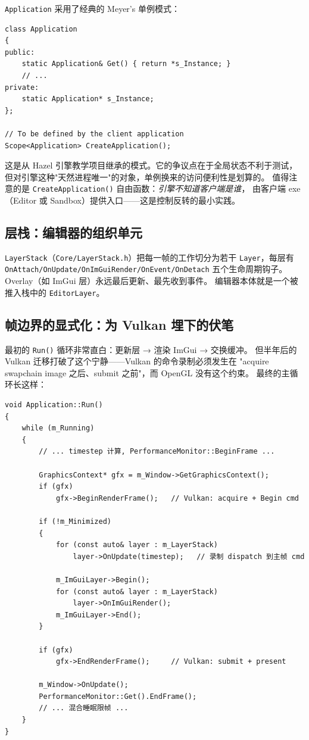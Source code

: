 \texttt{Application} 采用了经典的 Meyer's 单例模式：

\begin{lstlisting}
class Application
{
public:
    static Application& Get() { return *s_Instance; }
    // ...
private:
    static Application* s_Instance;
};

// To be defined by the client application
Scope<Application> CreateApplication();
\end{lstlisting}

这是从 Hazel 引擎教学项目继承的模式。它的争议点在于全局状态不利于测试，
但对引擎这种"天然进程唯一"的对象，单例换来的访问便利性是划算的。
值得注意的是 \texttt{CreateApplication()} 自由函数：\emph{引擎不知道客户端是谁}，
由客户端 exe（Editor 或 Sandbox）提供入口——这是控制反转的最小实践。

\subsection{层栈：编辑器的组织单元}

\texttt{LayerStack}（\texttt{Core/LayerStack.h}）把每一帧的工作切分为若干
\texttt{Layer}，每层有 \texttt{OnAttach/OnUpdate/OnImGuiRender/OnEvent/OnDetach}
五个生命周期钩子。Overlay（如 ImGui 层）永远最后更新、最先收到事件。
编辑器本体就是一个被推入栈中的 \texttt{EditorLayer}。

\subsection{帧边界的显式化：为 Vulkan 埋下的伏笔}

最初的 \texttt{Run()} 循环非常直白：更新层 → 渲染 ImGui → 交换缓冲。
但半年后的 Vulkan 迁移打破了这个宁静——Vulkan 的命令录制必须发生在
"acquire swapchain image 之后、submit 之前"，而 OpenGL 没有这个约束。
最终的主循环长这样：

\begin{lstlisting}
void Application::Run()
{
    while (m_Running)
    {
        // ... timestep 计算, PerformanceMonitor::BeginFrame ...

        GraphicsContext* gfx = m_Window->GetGraphicsContext();
        if (gfx)
            gfx->BeginRenderFrame();   // Vulkan: acquire + Begin cmd

        if (!m_Minimized)
        {
            for (const auto& layer : m_LayerStack)
                layer->OnUpdate(timestep);   // 录制 dispatch 到主帧 cmd

            m_ImGuiLayer->Begin();
            for (const auto& layer : m_LayerStack)
                layer->OnImGuiRender();
            m_ImGuiLayer->End();
        }

        if (gfx)
            gfx->EndRenderFrame();     // Vulkan: submit + present

        m_Window->OnUpdate();
        PerformanceMonitor::Get().EndFrame();
        // ... 混合睡眠限帧 ...
    }
}
\end{lstlisting}

